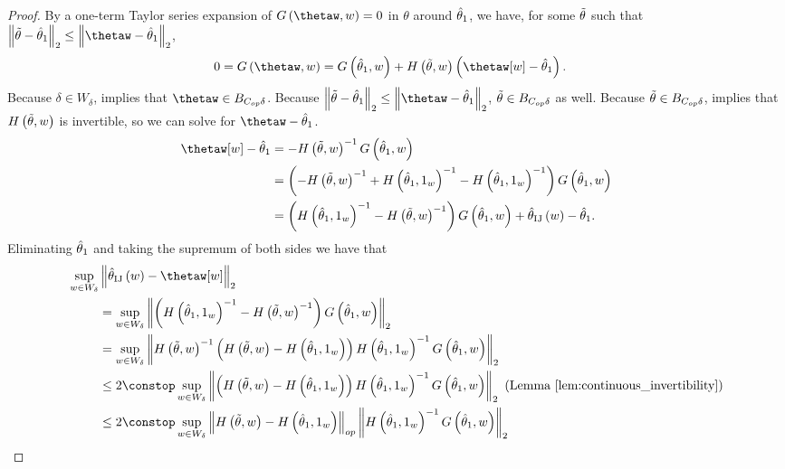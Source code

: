 %
\begin{proof}
By a one-term Taylor series expansion of $G\left(\thetaw,w\right)=0$
in $\theta$ around $\hat{\theta}_{1}$, we have, for some $\tilde{\theta}$
such that $\norm{\thetawiggle-\thetaone}_{2}\le\norm{{{\thetaw}}-\thetaone}_{2}$,
\begin{align*}
0=G\left(\thetaw,w\right) & =G\left(\thetaone,w\right)+H\left(\thetawiggle,w\right)\left(\thetaw[w]-\thetaone\right).
\end{align*}
Because $\delta\in W_{\delta}$, 
implies that $\thetaw\in\thetadeltaball$. Because $\norm{\thetawiggle-\thetaone}_{2}\le\norm{{{\thetaw}}-\thetaone}_{2}$,
$\tilde{\theta}\in B_{C_{op}\delta}$ as well. Because $\tilde{\theta}\in B_{C_{op}\delta}$,
 implies that $H\left(\tilde{\theta},w\right)$
is invertible, so we can solve for $\thetaw-\thetaone$.
\begin{align*}
\thetaw[w]-\thetaone & =-H\left(\thetawiggle,w\right)^{-1}G\left(\thetaone,w\right)\\
 & =\left(-H\left(\thetawiggle,w\right)^{-1}+H\left(\thetaone,\onevec\right)^{-1}-H\left(\thetaone,\onevec\right)^{-1}\right)G\left(\thetaone,w\right)\\
 & =\left(H\left(\thetaone,\onevec\right)^{-1}-H\left(\thetawiggle,w\right)^{-1}\right)G\left(\thetaone,w\right)+\thetaij\left(w\right)-\thetaone.
\end{align*}
Eliminating $\hat{\theta}_{1}$ and taking the supremum of both sides we
have that
\begin{align*}
\sup_{w\in W_{\delta}} & \norm{\thetaij\left(w\right)-{{\thetaw[w]}}}_{2}\\
 & =\sup_{w\in W_{\delta}}\norm{\left(H\left(\thetaone,\onevec\right)^{-1}-H\left(\thetawiggle,w\right)^{-1}\right)G\left(\thetaone,w\right)}_{2}\\
 & =\sup_{w\in W_{\delta}}\norm{H\left(\thetawiggle,w\right)^{-1}\left(H\left(\thetawiggle,w\right)-H\left(\thetaone,\onevec\right)\right)H\left(\thetaone,\onevec\right)^{-1}G\left(\thetaone,w\right)}_{2}\\
 & \le2\constop\sup_{w\in W_{\delta}}\norm{\left(H\left(\thetawiggle,w\right)-H\left(\thetaone,\onevec\right)\right)H\left(\thetaone,\onevec\right)^{-1}G\left(\thetaone,w\right)}_{2}\textrm{ (Lemma \ref{lem:continuous_invertibility})}\\
 & \le2\constop\sup_{w\in W_{\delta}}\norm{H\left(\thetawiggle,w\right)-H\left(\thetaone,\onevec\right)}_{op}\norm{H\left(\thetaone,\onevec\right)^{-1}G\left(\thetaone,w\right)}_{2}\\

\end{align*}
\end{proof}
